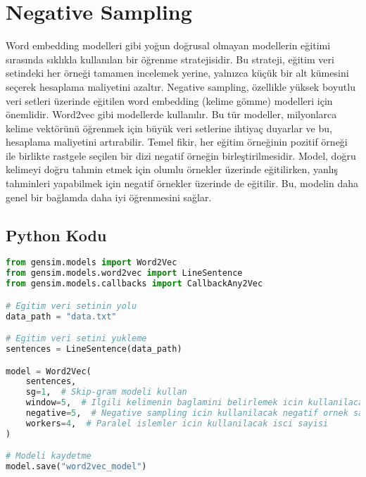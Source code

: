 \section{Negative Sampling}
Word embedding modelleri gibi yoğun doğrusal olmayan modellerin eğitimi sırasında sıklıkla kullanılan bir öğrenme stratejisidir. Bu strateji, eğitim veri setindeki her örneği tamamen incelemek yerine, yalnızca küçük bir alt kümesini seçerek hesaplama maliyetini azaltır. Negative sampling, özellikle yüksek boyutlu veri setleri üzerinde eğitilen word embedding (kelime gömme) modelleri için önemlidir. Word2vec gibi modellerde kullanılır. Bu tür modeller, milyonlarca kelime vektörünü öğrenmek için büyük veri setlerine ihtiyaç duyarlar ve bu, hesaplama maliyetini artırabilir. Temel fikir, her eğitim örneğinin pozitif örneği ile birlikte rastgele seçilen bir dizi negatif örneğin birleştirilmesidir. Model, doğru kelimeyi doğru tahmin etmek için olumlu örnekler üzerinde eğitilirken, yanlış tahminleri yapabilmek için negatif örnekler üzerinde de eğitilir. Bu, modelin daha genel bir bağlamda daha iyi öğrenmesini sağlar.

\subsection{Python Kodu}

\begin{lstlisting}[language=Python]
from gensim.models import Word2Vec
from gensim.models.word2vec import LineSentence
from gensim.models.callbacks import CallbackAny2Vec

# Egitim veri setinin yolu
data_path = "data.txt"

# Egitim veri setini yukleme
sentences = LineSentence(data_path)

model = Word2Vec(
    sentences,
    sg=1,  # Skip-gram modeli kullan
    window=5,  # Ilgili kelimenin baglamini belirlemek icin kullanilacak kelime penceresinin boyutu
    negative=5,  # Negative sampling icin kullanilacak negatif ornek sayisi
    workers=4,  # Paralel islemler icin kullanilacak isci sayisi
)

# Modeli kaydetme
model.save("word2vec_model")
\end{lstlisting}

\newpage
